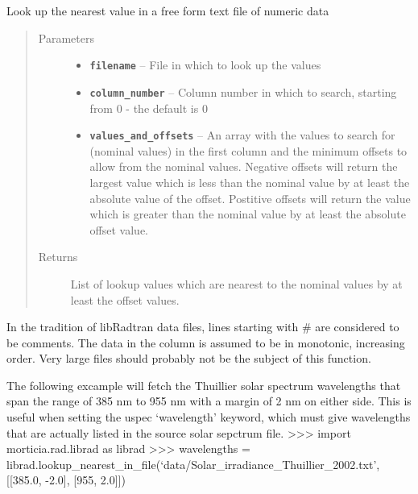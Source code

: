 \documentclass[a4paper,10pt,english]{sphinxmanual}
\begin{document}
\begin{fulllineitems}
\label{packages:librad.lookup_nearest_in_file}
Look up the nearest value in a free form text file of numeric data
\begin{quote}\begin{description}
\item[{Parameters}] \leavevmode\begin{itemize}
\item {} 
\textbf{\texttt{filename}} -- File in which to look up the values

\item {} 
\textbf{\texttt{column\_number}} -- Column number in which to search, starting from 0 - the default is 0

\item {} 
\textbf{\texttt{values\_and\_offsets}} -- An array with the values to search for (nominal values) in the first column and the
minimum offsets to allow from the nominal values. Negative offsets will return the largest value which is
less than the nominal value by at least the absolute value of the offset. Postitive offsets will return the
value which is greater than the nominal value by at least the absolute offset value.

\end{itemize}

\item[{Returns}] \leavevmode
List of lookup values which are nearest to the nominal values by at least the offset values.

\end{description}\end{quote}

In the tradition of libRadtran data files, lines starting with \# are considered to be comments.
The data in the column is assumed to be in monotonic, increasing order.
Very large files should probably not be the subject of this function.

The following excample will fetch the Thuillier solar spectrum wavelengths that span the range of
385 nm to 955 nm with a margin of 2 nm on either side. This is useful when setting the uspec `wavelength'
keyword, which must give wavelengths that are actually listed in the source solar sepctrum file.
\textgreater{}\textgreater{}\textgreater{} import morticia.rad.librad as librad
\textgreater{}\textgreater{}\textgreater{} wavelengths  = librad.lookup\_nearest\_in\_file(`data/Solar\_irradiance\_Thuillier\_2002.txt', {[}{[}385.0, -2.0{]}, {[}955, 2.0{]}{]})

\end{fulllineitems}
\end{document}

